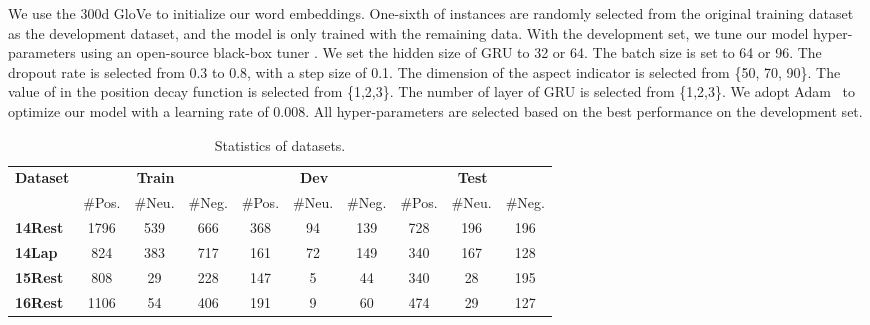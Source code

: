 \documentclass[11pt,a4paper]{article}
\begin{document}
We use the 300d GloVe \cite{pennington2014glove} to initialize our word embeddings.  One-sixth of instances are randomly selected from the original training dataset as the development dataset, and the model is only trained with the remaining data. With the development set, we tune our model hyper-parameters using an open-source black-box tuner \cite{alberto}. We set the hidden size of GRU to 32 or 64. The batch size is set to 64 or 96. The dropout rate is selected from 0.3 to 0.8, with a step size of 0.1. The dimension of the aspect indicator is selected from \{50, 70, 90\}. The value of  in the position decay function is selected from \{1,2,3\}. The number of layer of GRU is selected from \{1,2,3\}. We adopt Adam~\cite{kingma2014adam} to optimize our model with a learning rate of 0.008. All hyper-parameters are selected based on the best performance on the development set.
\begin{table}[t!]
\centering
\resizebox{\columnwidth}{!}
{\begin{tabular}{@{~}l@{~}c@{~}c@{~}c@{~}c@{~}c@{~}c@{~}c@{~}c@{~}c@{~}}
\toprule
 \multirow{2}{*}{\textbf{Dataset}}  & \multicolumn{3}{c}{\textbf{Train}}  & \multicolumn{3}{c}{\textbf{Dev}}  & \multicolumn{3}{c}{\textbf{Test}} \\ \cmidrule(lr){2-4}\cmidrule(lr){5-7} \cmidrule(lr){8-10}
& \#Pos. & \#Neu. & \#Neg. &  \#Pos. & \#Neu. & \#Neg. & \#Pos. & \#Neu. & \#Neg.  \\\hline 
\textbf{14Rest}  & 1796 & 539 & 666  & 368 & 94 & 139 & 728 & 196 & 196 \\
\textbf{14Lap}  &  824 & 383 & 717 &  161 & 72  & 149 & 340 & 167 & 128 \\
\textbf{15Rest} &  808 & 29 & 228 &  147 &5 & 44 &  340 & 28 & 195 \\
\textbf{16Rest} & 1106 & 54 & 406 &  191 & 9 & 60 & 474 & 29 & 127 \\



\bottomrule
\end{tabular}}
\caption{Statistics of datasets.  }
\label{tab:statistics}
\vspace{-2mm}
\end{table}
\end{document}
